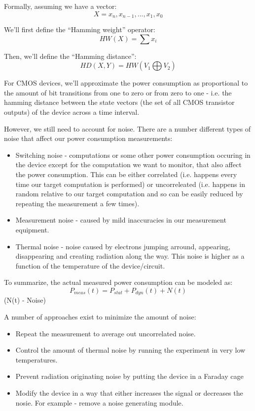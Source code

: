 Formally, assuming we have a vector:
\begin{displaymath}
    X=x_{n},x_{n-1},...,x_{1},x_{0}
\end{displaymath}

We'll first define the ``Hamming weight'' operator:
\begin{displaymath}
    HW(X)=\sum x_{i}
\end{displaymath}

Then, we'll define the ``Hamming distance'': 
\begin{displaymath}
    HD(X,Y)=HW(V_{1} \bigoplus V_{2})
\end{displaymath}

For CMOS devices, we'll approximate the power consumption as proportional to the amount of bit transitions from one to zero or from zero to one - i.e. the hamming distance between the state vectors (the set of all CMOS transistor outputs) of the device across a time interval.

However, we still need to account for noise. There are a number different types of noise that affect our power consumption measurements:
\begin{itemize}
    \item Switching noise - computations or some other power consumption occuring in the device except for the computation we want to monitor, that also affect the power consumption. This can be either correlated (i.e. happens every time our target computation is performed) or uncorreleated (i.e. happens in random relative to our target computation and so can be easily reduced by repeating the measurement a few times).
    \item Measurement noise - caused by mild inaccuracies in our measurement equipment.
    \item Thermal noise - noise caused by electrons jumping arround, appearing, disappearing and creating radiation along the way. This noise is higher as a function of the temperature of the device/circuit.
\end{itemize}

To summarize, the actual measured power consumption can be modeled as:
\begin{displaymath}
    P_{meas}(t)=P_{stat} + P_{dyn}(t) + N(t)
\end{displaymath}
(N(t) - Noise)

A number of approaches exist to minimize the amount of noise:
\begin{itemize}
    \item Repeat the measurement to average out uncorrelated noise.
    \item Control the amount of thermal noise by running the experiment in very low temperatures.
    \item Prevent radiation originating noise by putting the device in a Faraday cage
    \item Modify the device in a way that either increases the signal or decreases the nosie. For example - remove a noise generating module.
\end{itemize}

